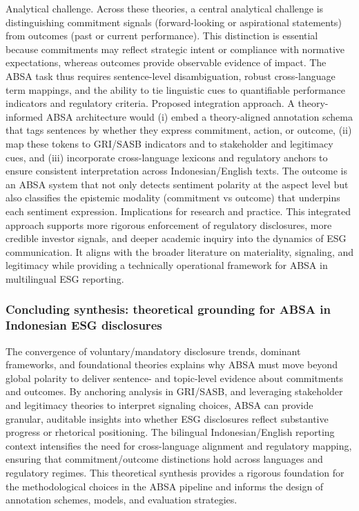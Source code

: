 Analytical challenge. Across these theories, a central analytical challenge is distinguishing commitment signals (forward-looking or aspirational statements) from outcomes (past or current performance). This distinction is essential because commitments may reflect strategic intent or compliance with normative expectations, whereas outcomes provide observable evidence of impact. The ABSA task thus requires sentence-level disambiguation, robust cross-language term mappings, and the ability to tie linguistic cues to quantifiable performance indicators and regulatory criteria.
Proposed integration approach. A theory-informed ABSA architecture would (i) embed a theory-aligned annotation schema that tags sentences by whether they express commitment, action, or outcome, (ii) map these tokens to GRI/SASB indicators and to stakeholder and legitimacy cues, and (iii) incorporate cross-language lexicons and regulatory anchors to ensure consistent interpretation across Indonesian/English texts. The outcome is an ABSA system that not only detects sentiment polarity at the aspect level but also classifies the epistemic modality (commitment vs outcome) that underpins each sentiment expression.
Implications for research and practice. This integrated approach supports more rigorous enforcement of regulatory disclosures, more credible investor signals, and deeper academic inquiry into the dynamics of ESG communication. It aligns with the broader literature on materiality, signaling, and legitimacy while providing a technically operational framework for ABSA in multilingual ESG reporting.
\subsubsection{Concluding synthesis: theoretical grounding for ABSA in Indonesian ESG disclosures}

The convergence of voluntary/mandatory disclosure trends, dominant frameworks, and foundational theories explains why ABSA must move beyond global polarity to deliver sentence- and topic-level evidence about commitments and outcomes. By anchoring analysis in GRI/SASB, and leveraging stakeholder and legitimacy theories to interpret signaling choices, ABSA can provide granular, auditable insights into whether ESG disclosures reflect substantive progress or rhetorical positioning. The bilingual Indonesian/English reporting context intensifies the need for cross-language alignment and regulatory mapping, ensuring that commitment/outcome distinctions hold across languages and regulatory regimes. This theoretical synthesis provides a rigorous foundation for the methodological choices in the ABSA pipeline and informs the design of annotation schemes, models, and evaluation strategies.